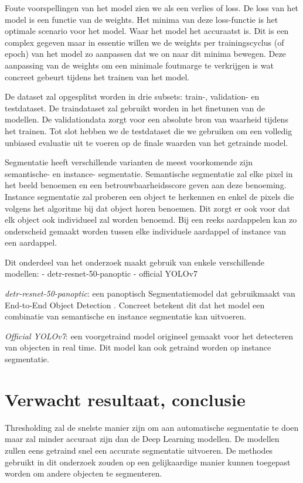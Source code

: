 Foute voorspellingen van het model zien we als een verlies of loss. De loss van het model is een functie van de weights. Het minima van deze loss-functie is het optimale scenario voor het model. Waar het model het accuraatst is. Dit is een complex gegeven maar in essentie willen we de weights per trainingscyclus (of epoch) van het model zo aanpassen dat we on naar dit minima bewegen. Deze aanpassing van de weights om een minimale foutmarge te verkrijgen is wat concreet gebeurt tijdens het trainen van het model.

De dataset zal opgesplitst worden in drie subsets: train-, validation- en testdataset. De traindataset zal gebruikt worden in het finetunen van de modellen. De validationdata zorgt voor een absolute bron van waarheid tijdens het trainen. Tot slot hebben we de testdataset die we gebruiken om een volledig unbiased evaluatie uit te voeren op de finale waarden van het getrainde model.


Segmentatie heeft verschillende varianten de meest voorkomende zijn semantische- en instance- segmentatie. Semantische segmentatie zal elke pixel in het beeld benoemen en een betrouwbaarheidsscore geven aan deze benoeming. Instance segmentatie zal proberen een object te herkennen en enkel de pixels die volgens het algoritme bij dat object horen benoemen. Dit zorgt er ook voor dat elk object ook individueel zal worden benoemd. Bij een reeks aardappelen kan zo onderscheid gemaakt worden tussen elke individuele aardappel of instance van een aardappel.

Dit onderdeel van het onderzoek maakt gebruik van enkele verschillende modellen:
- detr-resnet-50-panoptic
- official YOLOv7

\textit{detr-resnet-50-panoptic}: een panoptisch Segmentatiemodel dat gebruikmaakt van End-to-End Object Detection \autocite{Carion2020}. Concreet betekent dit dat het model een combinatie van semantische en instance segmentatie kan uitvoeren. 

\textit{Official YOLOv7}: een voorgetraind model origineel gemaakt voor het detecteren van objecten in real time. Dit model kan ook getraind worden op instance segmentatie.


\section{Verwacht resultaat, conclusie}%
\label{sec:verwachte_resultaten}

Thresholding zal de snelste manier zijn om aan automatische segmentatie te doen maar zal minder accuraat zijn dan de Deep Learning modellen. De modellen zullen eens getraind snel een accurate segmentatie uitvoeren. De methodes gebruikt in dit onderzoek zouden op een gelijkaardige manier kunnen toegepast worden om andere objecten te segmenteren.

